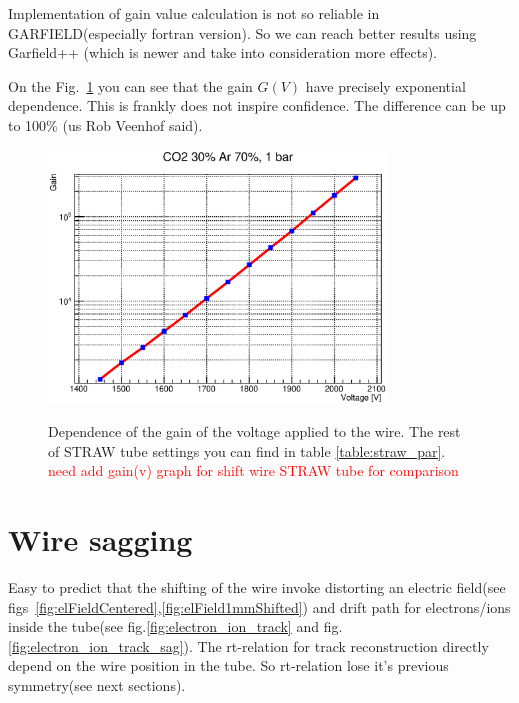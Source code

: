 \documentclass[]{article}
\begin{document}
	Implementation of gain value calculation is not so reliable in GARFIELD(especially fortran version). So we can reach better results using Garfield++ (which is newer and take into consideration more effects).

	On the Fig.~\ref{fig:gain-voltage-dendence} you can see that the gain $G(V)$ have precisely exponential dependence. This is frankly does not inspire confidence. The difference can be up to 100\% (us Rob Veenhof\cite{garfield} said).
	
	\begin{figure}[h!]
	\centering
	\includegraphics[width=0.8\textwidth]{gain_1450_2050V}
	\label{fig:gain-voltage-dendence}	
	\caption{Dependence of the gain of the voltage applied to the wire. The rest of STRAW tube settings you can find in table \ref{table:straw_par}. \textcolor{red}{need add gain(v) graph for shift wire STRAW tube for comparison} }
	\end{figure}
	
	\section{ Wire sagging}
	Easy to predict that the shifting of the wire invoke distorting an electric field(see figs~\ref{fig:elFieldCentered},\ref{fig:elField1mmShifted}) and drift path for electrons/ions inside the tube(see fig.\ref{fig:electron_ion_track} and fig.\ref{fig:electron_ion_track_sag}). The rt-relation for track reconstruction directly depend on the wire position in the tube. So rt-relation lose it's previous symmetry(see next sections).
	
\end{document}
